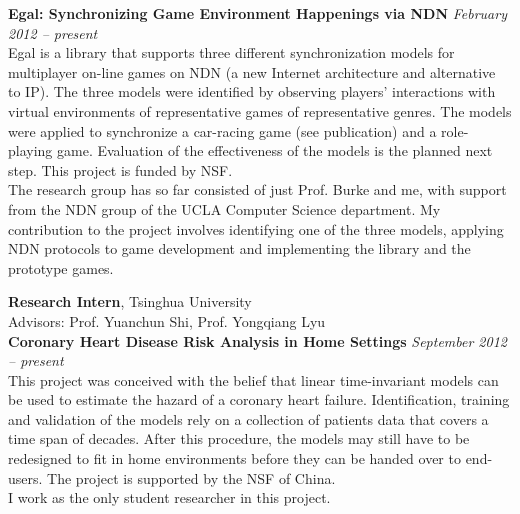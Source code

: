 \documentclass[margin,line]{resume}
\begin{document}
\begin{resume}
    \textbf{Egal: Synchronizing Game Environment Happenings via NDN} \hfill \textsl{February 2012 -- present}\\
    Egal is a library that supports three different synchronization models for multiplayer on-line games on NDN (a new Internet architecture and alternative to IP). The three models were identified by observing players' interactions with virtual environments of representative games of representative genres. The models were applied to synchronize a car-racing game (see publication) and a role-playing game. Evaluation of the effectiveness of the models is the planned next step. This project is funded by NSF. \\
   The research group has so far consisted of just Prof. Burke and me, with support from the NDN group of the UCLA Computer Science department. My contribution to the project involves identifying one of the three models, applying NDN protocols to game development and implementing the library and the prototype games.

    \textbf{Research Intern}, Tsinghua University \\
    Advisors: Prof. Yuanchun Shi, Prof. Yongqiang Lyu \vspace{2mm}\\%
    \textbf{Coronary Heart Disease Risk Analysis in Home Settings} \hfill \textsl{September 2012 -- present}\\
    This project was conceived with the belief that linear time-invariant models can be used to estimate the hazard of a coronary heart failure. Identification, training and validation of the models rely on a collection of patients data that covers a time span of decades. After this procedure, the models may still have to be redesigned to fit in home environments before they can be handed over to end-users. The project is supported by the NSF of China. \\
    I work as the only student researcher in this project.\\
   
   \vspace{5cm}
   
    


\end{resume}
\end{document}

